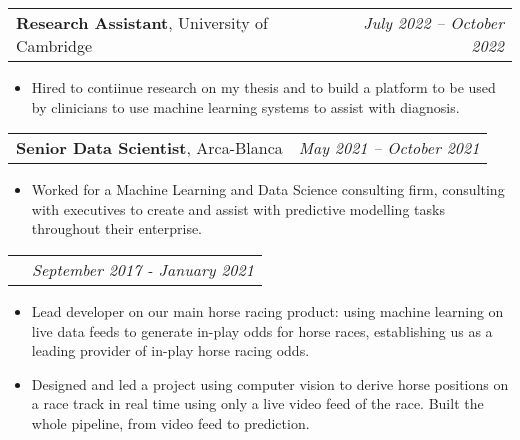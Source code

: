 \documentclass[letterpaper,11pt]{article}
\makeatletter
\newcommand{\resumeitem}[1]{
  \item{
    {#1 \vspace{0pt}}
  }
}
\newcommand{\resumesubheading}[4]{
  \vspace{2pt}\item
    \begin{tabular*}{0.97\textwidth}[t]{l@{\extracolsep{\fill}}r}
      \textbf{#1}, {#3} & \textit{#4} \\
    \end{tabular*}\vspace{-3pt}
}
\newcommand{\resumeitemliststart}{\begin{itemize}}
\newcommand{\resumeitemlistend}{\end{itemize}\vspace{-3pt}}
\makeatother
\begin{document}
    \resumesubheading{Research Assistant}{}{University of Cambridge}{July 2022 – October 2022}
        \resumeitemliststart
            \resumeitem{
                Hired to contiinue research on my thesis and to build a platform to be used by clinicians to use machine learning systems to assist with diagnosis.
            }
        \resumeitemlistend

    \resumesubheading{Senior Data Scientist}{}{Arca-Blanca}{May 2021 – October 2021}
        \resumeitemliststart
            \resumeitem{
                Worked for a Machine Learning and Data Science consulting firm, consulting with executives to create and assist with predictive modelling tasks throughout their enterprise.
            }
        \resumeitemlistend

    \resumesubheading{\iftoggle{superbold}{Senior }{}\iftoggle{ml}{Machine Learning Engineer}{Data Scientist}}{}{After the Off}{September 2017 - January 2021}
        \resumeitemliststart
            \resumeitem{
                Lead developer on our main horse racing product: using machine learning on live data feeds to generate in-play odds for horse races, establishing us as a leading provider of in-play horse racing odds.
            }
            \resumeitem{
                Designed and led a project using computer vision to derive horse positions on a race track in real time using only a live video feed of the race. Built the whole pipeline, from video feed to prediction.
            }
        \resumeitemlistend
\end{document}
